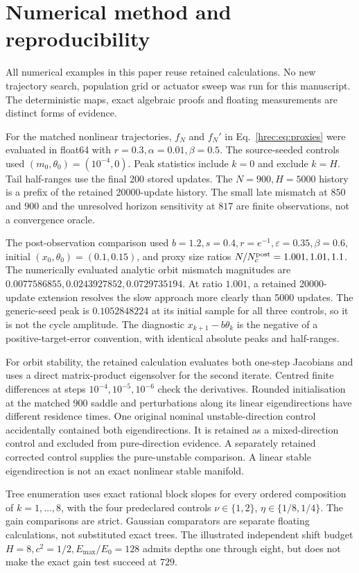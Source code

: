 \section{Numerical method and reproducibility}
\label{hrec:app:method}
All numerical examples in this paper reuse retained calculations. No new trajectory search, population grid or actuator sweep was run for this manuscript. The deterministic maps, exact algebraic proofs and floating measurements are distinct forms of evidence.

For the matched nonlinear trajectories, \(f_N\) and \(f_N'\) in Eq.~\eqref{hrec:eq:proxies} were evaluated in float64 with \(r=0.3,\alpha=0.01,\beta=0.5\). The source-seeded controls used \((m_0,\theta_0)=(10^{-4},0)\). Peak statistics include \(k=0\) and exclude \(k=H\). Tail half-ranges use the final 200 stored updates. The \(N=900,H=5000\) history is a prefix of the retained 20000-update history. The small late mismatch at \(850\) and \(900\) and the unresolved horizon sensitivity at \(817\) are finite observations, not a convergence oracle.

The post-observation comparison used \(b=1.2,s=0.4,r=e^{-1},\varepsilon=0.35,\beta=0.6\), initial \((x_0,\theta_0)=(0.1,0.15)\), and proxy size ratios \(N/N_c^{\rm post}=1.001,1.01,1.1\). The numerically evaluated analytic orbit mismatch magnitudes are \(0.0077586855,0.0243927852,0.0729735194\). At ratio \(1.001\), a retained 20000-update extension resolves the slow approach more clearly than 5000 updates. The generic-seed peak is \(0.1052848224\) at its initial sample for all three controls, so it is not the cycle amplitude. The diagnostic \(x_{k+1}-b\theta_k\) is the negative of a positive-target-error convention, with identical absolute peaks and half-ranges.

For orbit stability, the retained calculation evaluates both one-step Jacobians and uses a direct matrix-product eigensolver for the second iterate. Centred finite differences at steps \(10^{-4},10^{-5},10^{-6}\) check the derivatives. Rounded initialisation at the matched \(900\) saddle and perturbations along its linear eigendirections have different residence times. One original nominal unstable-direction control accidentally contained both eigendirections. It is retained as a mixed-direction control and excluded from pure-direction evidence. A separately retained corrected control supplies the pure-unstable comparison. A linear stable eigendirection is not an exact nonlinear stable manifold.

Tree enumeration uses exact rational block slopes for every ordered composition of \(k=1,\ldots,8\), with the four predeclared controls \(\nu\in\{1,2\}\), \(\eta\in\{1/8,1/4\}\). The gain comparisons are strict. Gaussian comparators are separate floating calculations, not substituted exact trees. The illustrated independent shift budget \(H=8,c^2=1/2,E_{\max}/E_0=128\) admits depths one through eight, but does not make the exact gain test succeed at \(729\).

